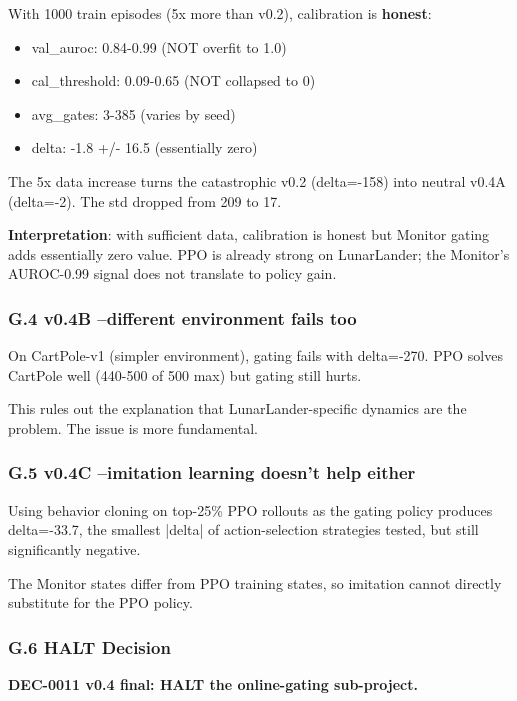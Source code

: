\documentclass[11pt]{article}
\begin{document}
With 1000 train episodes (5x more than v0.2), calibration is \textbf{honest}:

\begin{itemize}
  \item val\_auroc: 0.84-0.99 (NOT overfit to 1.0)
  \item cal\_threshold: 0.09-0.65 (NOT collapsed to 0)
  \item avg\_gates: 3-385 (varies by seed)
  \item delta: -1.8 +/- 16.5 (essentially zero)
\end{itemize}


The 5x data increase turns the catastrophic v0.2 (delta=-158) into neutral
v0.4A (delta=-2). The std dropped from 209 to 17.

\textbf{Interpretation}: with sufficient data, calibration is honest but Monitor
gating adds essentially zero value. PPO is already strong on LunarLander;
the Monitor's AUROC-0.99 signal does not translate to policy gain.

\subsubsection{G.4 v0.4B --different environment fails too}

On CartPole-v1 (simpler environment), gating fails with delta=-270.
PPO solves CartPole well (440-500 of 500 max) but gating still hurts.

This rules out the explanation that LunarLander-specific dynamics are the
problem. The issue is more fundamental.

\subsubsection{G.5 v0.4C --imitation learning doesn't help either}

Using behavior cloning on top-25\% PPO rollouts as the gating policy
produces delta=-33.7, the smallest |delta| of action-selection strategies
tested, but still significantly negative.

The Monitor states differ from PPO training states, so imitation cannot
directly substitute for the PPO policy.

\subsubsection{G.6 HALT Decision}

\textbf{DEC-0011 v0.4 final: HALT the online-gating sub-project.}
\end{document}

